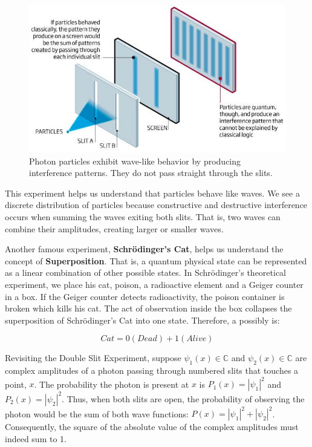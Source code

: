 \documentclass[letterpaper, 10 pt, conference]{ieeeconf}
\begin{document}
\begin{figure}[h!]
  \includegraphics[width=\linewidth]{1.jpg}
  \caption{Photon particles exhibit wave-like behavior by producing interference patterns.  They do not pass straight through the slits.}
\end{figure}

This experiment helps us understand that particles behave like waves.  We see a discrete distribution of particles because constructive and destructive interference occurs when summing the waves exiting both slits.  That is, two waves can combine their amplitudes, creating larger or smaller waves.

Another famous experiment, \textbf{Schrödinger's Cat}, helps us understand the concept of \textbf{Superposition}.  That is, a quantum physical state can be represented as a linear combination of other possible states.  In Schrödinger's theoretical experiment, we place his cat, poison, a radioactive element and a Geiger counter in a box.  If the Geiger counter detects radioactivity, the poison container is broken which kills his cat.  The act of observation inside the box collapses the superposition of Schrödinger's Cat into one state.  Therefore, a possibly is:

\[ Cat = 0(Dead) + 1(Alive) \]

Revisiting the Double Slit Experiment, suppose \( \psi_1(x) \in \mathbb{C} \) and \( \psi_2(x) \in \mathbb{C} \) are complex amplitudes of a photon passing through numbered slits that touches a point, \(x\).  The probability the photon is present at \(x\) is \( P_1(x) = |\psi_1|^2 \) and \( P_2(x) = |\psi_2|^2 \).  Thus, when both slits are open, the probability of observing the photon would be the sum of both wave functions: \( P(x) = |\psi_1|^2 + |\psi_2|^2 \).  Consequently, the square of the absolute value of the complex amplitudes must indeed sum to 1.
\end{document}
